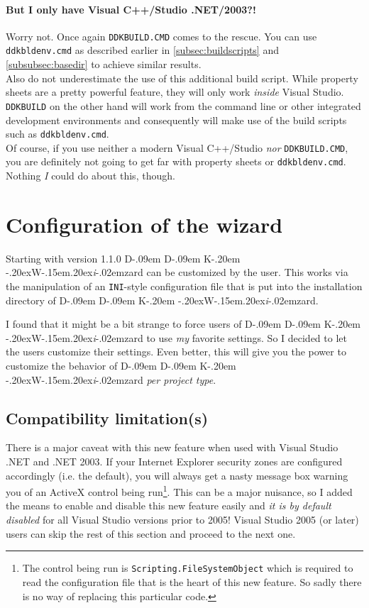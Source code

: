 \documentclass[a4paper,titlepage]{report}
\def\ddkwiz{D\kern-.09em D\kern-.09em K\kern-.20em \raise-.20ex\hbox{W}\kern-.15em\raise.20ex\hbox{\it{i}}\kern-.02em{zard}}
\begin{document}
\subsubsection{But I only have Visual C++/Studio .NET/2003?!}
Worry not. Once again \texttt{DDKBUILD.CMD} comes to the rescue. You can use \texttt{ddkbldenv.cmd}
as described earlier in \autoref{subsec:buildscripts} and \autoref{subsubsec:basedir} to achieve
similar results.\\
Also do not underestimate the use of this additional build script. While property sheets
are a pretty powerful feature, they will only work \emph{inside} Visual Studio.
\texttt{DDKBUILD} on the other hand will work from the command line or other integrated
development environments and consequently will make use of the build scripts such as
\texttt{ddkbldenv.cmd}.\\

Of course, if you use neither a modern Visual C++/Studio \emph{nor} \texttt{DDKBUILD.CMD}, you are
definitely not going to get far with property sheets or \texttt{ddkbldenv.cmd}. Nothing \emph{I}
could do about this, though.

\chapter{Configuration of the wizard}\thispagestyle{fancy}
Starting with version 1.1.0 \ddkwiz{} can be customized by the user. This works
via the manipulation of an \texttt{INI}-style configuration file that is put into the
installation directory of \ddkwiz{}.

I found that it might be a bit strange to force users of \ddkwiz{} to use \emph{my}
favorite settings. So I decided to let the users customize their settings. Even better,
this will give you the power to customize the behavior of \ddkwiz{} \emph{per project
type}.

\section{Compatibility limitation(s)}
\label{compat:activex}
There is a major caveat with this new feature when used with
Visual Studio .NET and .NET 2003. If your Internet Explorer security zones
are configured accordingly (i.e. the default), you will always get a nasty message box
warning you of an ActiveX control being run\footnote{The control being run is
\texttt{Scripting.FileSystemObject} which is required to read the configuration
file that is the heart of this new feature. So sadly there is no way of
replacing this particular code.}. This can be a major nuisance, so I
added the means to enable and disable this new feature easily and \emph{it is by default
disabled} for all Visual Studio versions prior to 2005! Visual Studio 2005 (or later)
users can skip the rest of this section and proceed to the next one.\\
\end{document}
